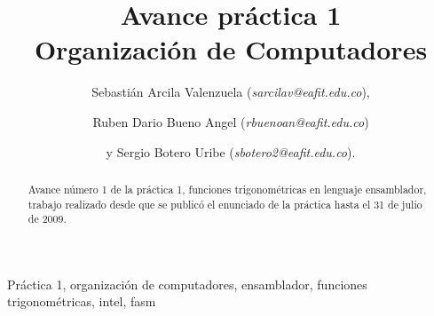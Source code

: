 \documentclass[%
	final,
	notitlepage,
	narroweqnarray,
	inline,
	twoside,
	]{ieee}
\begin{document}
\title[Avance práctica 1]{%
       Avance práctica 1 \\  Organización de Computadores}

\author[]{Sebastián Arcila Valenzuela (\textit{sarcilav@eafit.edu.co}),
\and{} Ruben Dario Bueno Angel (\textit{rbuenoan@eafit.edu.co})
\and{}y Sergio Botero Uribe (\textit{sbotero2@eafit.edu.co}).
}


\titletext{, \today}


\maketitle               

\begin{abstract} 
Avance número 1 de la práctica 1, funciones trigonométricas en lenguaje ensamblador, trabajo realizado desde que se publicó el enunciado de la práctica hasta el 31 de julio de 2009.
\end{abstract}

\begin{keywords}
Práctica 1, organización de computadores, ensamblador, funciones trigonométricas, intel, fasm
\end{keywords}
\end{document}
